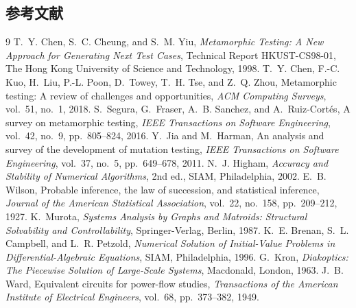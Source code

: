 \subsection{参考文献}
{\renewcommand{\section}[2]{}%
\begin{thebibliography}{9}\small
{} T.~Y. Chen, S.~C. Cheung, and S.~M. Yiu,
\emph{Metamorphic Testing: A New Approach for Generating Next Test Cases},
Technical Report HKUST-CS98-01, The Hong Kong University of Science and
Technology, 1998.
 T.~Y. Chen, F.-C. Kuo, H.~Liu, P.-L. Poon, D.~Towey,
T.~H. Tse, and Z.~Q. Zhou, Metamorphic testing: A review of challenges and
opportunities, \emph{ACM Computing Surveys}, vol.~51, no.~1, 2018.
 S.~Segura, G.~Fraser, A.~B. Sanchez, and
A.~Ruiz-Cort\'es, A survey on metamorphic testing, \emph{IEEE Transactions on
Software Engineering}, vol.~42, no.~9, pp.~805--824, 2016.
 Y.~Jia and M.~Harman, An analysis and survey of the
development of mutation testing, \emph{IEEE Transactions on Software
Engineering}, vol.~37, no.~5, pp.~649--678, 2011.
 N.~J. Higham, \emph{Accuracy and Stability of
Numerical Algorithms}, 2nd ed., SIAM, Philadelphia, 2002.
 E.~B. Wilson, Probable inference, the law of
succession, and statistical inference, \emph{Journal of the American
Statistical Association}, vol.~22, no.~158, pp.~209--212, 1927.
 K.~Murota, \emph{Systems Analysis by Graphs and
Matroids: Structural Solvability and Controllability}, Springer-Verlag,
Berlin, 1987.
 K.~E. Brenan, S.~L. Campbell, and L.~R. Petzold,
\emph{Numerical Solution of Initial-Value Problems in Differential-Algebraic
Equations}, SIAM, Philadelphia, 1996.
 G.~Kron, \emph{Diakoptics: The Piecewise Solution of
Large-Scale Systems}, Macdonald, London, 1963.
 J.~B. Ward, Equivalent circuits for power-flow studies,
\emph{Transactions of the American Institute of Electrical Engineers},
vol.~68, pp.~373--382, 1949.
\end{thebibliography}}
